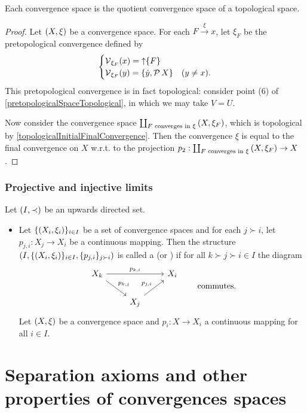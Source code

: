 \begin{proposition} \label{convergenceSpaceQuotientOfTopologicalSpace}
Each convergence space is the quotient convergence space of a topological space.
\end{proposition}
\begin{proof}
Let $\left( X,\xi \right)$ be a convergence space. For each $F\overset{\xi}{\longrightarrow} x$, let $\xi_F$ be the pretopological convergence defined by
\[ \begin{cases}
\operatorname{\mathcal{V}}_{\xi_F}(x) = \operatorname{\uparrow}\{F\} \\
\operatorname{\mathcal{V}}_{\xi_F}(y) = \{\dot{y}, \operatorname{\mathcal{P}}{X}\} & (y \neq x).
\end{cases} \]
This pretopological convergence is in fact topological: consider point (6) of \ref{pretopologicalSpaceTopological}, in which we may take $V = U$.

Now consider the convergence space $\coprod_{\text{$F$ converges in $\xi$}}\left( X, \xi_F \right)$, which is topological by \ref{topologicalInitialFinalConvergence}. Then the convergence $\xi$ is equal to the final convergence on $X$ w.r.t. to the projection $p_2: \coprod_{\text{$F$ converges in $\xi$}}\left( X, \xi_F \right) \to X$.
\end{proof}

\subsection{Projective and injective limits}
\begin{definition}
Let $\left( I, \prec \right)$ be an upwards directed set.
\begin{itemize}
\item Let $\{\left( X_i, \xi_i \right)\}_{i\in I}$ be a set of convergence spaces and for each $j \succ i$, let $p_{j,i}: X_j \to X_i$ be a continuous mapping. Then the structure $\left( I, \{\left( X_i, \xi_i \right)\}_{i\in I}, \{p_{j,i}\}_{j\succ i} \right)$ is called a  (or ) if for all $k \succ j \succ i \in I$ the diagram
\[ \begin{tikzcd}
X_k \ar[rr, "p_{k,i}"] \ar[rd, "p_{k,j}"] & & X_i \\
& X_j \ar[ur, "p_{j,i}"]
\end{tikzcd} \qquad \text{commutes.} \]
Let $\left( X, \xi \right)$ be a convergence space and $p_i: X\to X_i$ a continuous mapping for all $i\in I$. 
\end{itemize}
\end{definition}

\chapter{Separation axioms and other properties of convergences spaces}

